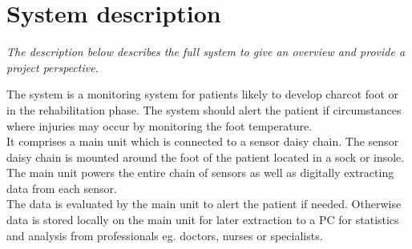 \chapter{System description}
\textit{The description below describes the full system to give an overview and provide a project perspective.}

The system is a monitoring system for patients likely to develop charcot foot or in the rehabilitation phase. The system should alert the patient if circumstances where injuries may occur by monitoring the foot temperature.\\
It comprises a main unit which is connected to a sensor daisy chain. The sensor daisy chain is mounted around the foot of the patient located in a sock or insole. The main unit powers the entire chain of sensors as well as digitally extracting data from each sensor.\\
The data is evaluated by the main unit to alert the patient if needed. Otherwise data is stored locally on the main unit for later extraction to a PC for statistics and analysis from professionals eg. doctors, nurses or specialists.\\

